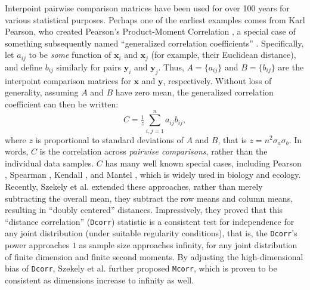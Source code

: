 \documentclass[11pt]{article}
\providecommand{\sct}[1]{{\sc \texttt{#1}}}
\providecommand{\mb}[1]{\boldsymbol{#1}}
\newcommand{\G}{C}
\newcommand{\Dcorr}{\sct{Dcorr}}
\newcommand{\Mcorr}{\sct{Mcorr}}
\newcommand{\Mantel}{\sct{Mantel}}
\newcommand{\mbx}{\ensuremath{\mb{x}}}
\newcommand{\mby}{\ensuremath{\mb{y}}}
\begin{document}
Interpoint pairwise comparison matrices have been used for over 100 years for various statistical purposes. Perhaps one of the earliest examples  comes from  Karl Pearson, who created Pearson's Product-Moment Correlation \cite{Pearson1895},   a special case of something subsequently named  ``generalized correlation coefficients'' \cite{KendallBook}.
Specifically, let $a_{ij}$ to be \emph{some} function of $\mbx_i$ and $\mbx_j$  (for example, their Euclidean distance), and define $b_{ij}$ similarly for pairs $\mby_i$ and $\mby_j$. Thus, $A=\{a_{ij}\}$ and $B=\{b_{ij}\}$ are the interpoint comparison matrices for $\mbx$ and $\mby$, respectively.  
Without loss of generality, assuming $A$ and $B$ have zero mean, the generalized correlation coefficient can then be written:
\begin{equation}
\label{generalCoef}
\G= \tfrac{1}{z} {\textstyle \sum_{i,j=1}^n a_{ij} b_{ij}},
\end{equation}
where $z$ is proportional to standard deviations of $A$ and $B$, that is $z=n^2\sigma_a \sigma_b$.
In words, $\G$ is the correlation across \emph{pairwise comparisons}, rather than the individual data samples.  
$\G$ has many well known special cases, including Pearson \cite{Pearson1895}, Spearman \cite{Spearman1904}, Kendall \cite{KendallBook}, and Mantel \cite{Mantel1967}, which is widely used in biology and ecology.
Recently, Szekely et al. \cite{SzekelyRizzoBakirov2007} extended these approaches, rather than merely subtracting the overall mean, they subtract the row means and column means, resulting in ``doubly centered'' distances.  Impressively, they proved that this ``distance correlation'' (\Dcorr) statistic is a consistent test for independence for any joint distribution (under suitable regularity conditions), that is, the \Dcorr's power approaches $1$ as sample size approaches infinity, for any joint distribution of finite dimension and finite second moments.
By adjusting the high-dimensional bias of \Dcorr, Szekely et al. \cite{SzekelyRizzo2013a} further proposed \Mcorr, which is proven to be consistent as dimensions increase to infinity as well.
\end{document}
